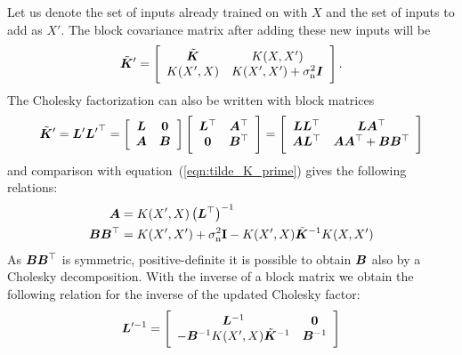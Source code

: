 Let us denote the set of inputs already trained on with $X$ and the set of 
inputs to add as $X'$. The block covariance matrix after adding these new inputs 
will be
\begin{equation} \label{eqn:tilde_K_prime}
    \tilde{\bm{K}}' = \left[ \begin{array}{cc}
            \tilde{\bm{K}} & K(X, X') \\ K(X', X) & K(X', X') 
            + \sigma_{\mathrm{n}}^2\bm{I}
        \end{array}
    \right]\text{.}
\end{equation}
The Cholesky factorization can also be written with block matrices
\begin{equation}
    \tilde{\bm{K}}' = \bm{L}' {\bm{L}'}^{\top} = \left[
        \begin{array}{cc}
            \bm{L} & \bm{0} \\ \bm{A} & \bm{B}
        \end{array}
    \right] \left[
        \begin{array}{cc}
            \bm{L}^{\top} & \bm{A}^{\top} \\ \bm{0} & \bm{B}^{\top}
        \end{array}
    \right] = \left[
        \begin{array}{cc}
            \bm{L} \bm{L}^{\top} & \bm{L} \bm{A}^{\top} \\ \bm{A} \bm{L}^{\top} & \bm{A} \bm{A}^{\top} + \bm{B} \bm{B}^{\top}
        \end{array}
    \right]
\end{equation}
and comparison with equation~(\ref{eqn:tilde_K_prime}) gives the following 
relations:
\begin{align}
    \mat A &= K(X', X) \del[1]{\mat L\Tr}^{-1} \\
    \mat B \mat B\Tr &= K(X', X') + \sigma\ped{n}^2\mat{\mathrm{I}} - K(X', 
    X)\tilde{\mat{K}}^{-1}K(X, X')
\end{align}
As $\bm{B} \bm{B}^{\top}$ is symmetric, positive-definite it is possible to obtain 
$\bm{B}$ also by a Cholesky decomposition.
With the inverse of a block matrix \parencite[45]{Petersen:2008wc} we obtain the 
following relation for the inverse of the updated Cholesky factor:
\begin{equation}
    \bm{L}'^{-1} = \left[
        \begin{array}{cc}
            \bm{L}^{-1} & \bm{0} \\ -\bm{B}^{-1} K(X', X)\tilde{\bm{K}}^{-1} 
            & \bm{B}^{-1}
        \end{array}
    \right]\label{eqn:invChol}
\end{equation}

